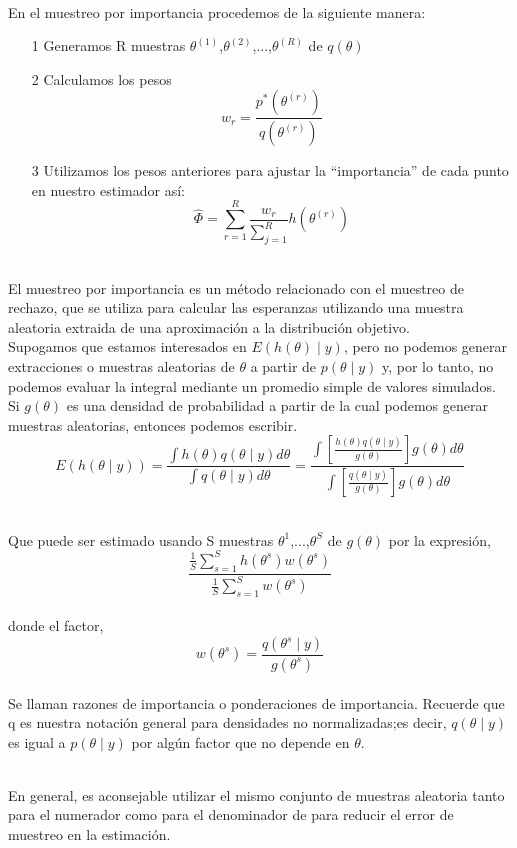 \documentclass[12pt]{beamer}
\begin{document}
\begin{frame}
~\\En el muestreo por importancia procedemos de la siguiente manera:
\begin{itemize}
\item[1]Generamos R muestras $\theta^{(1)}$,$\theta^{(2)}$,...,$\theta^{(R)}$ de $q(\theta)$
\item[2]Calculamos los pesos
$$w_{r}=\frac{p^*(\theta^{(r)})}{q(\theta^{(r)})}$$
\item[3]Utilizamos los pesos anteriores para ajustar la “importancia” de cada punto en nuestro estimador así:
$$\hat{\Phi}=\sum\limits_{r=1}^{R}\frac{w_{r}}{\sum\limits_{j=1}^{R}}h(\theta^{(r)}) $$
\end{itemize}
\end{frame}

\begin{frame}
~\\El muestreo por importancia es un método relacionado con el muestreo de rechazo, que se utiliza para calcular las esperanzas utilizando una muestra aleatoria extraida de una aproximación a la distribución objetivo. 
~\\Supogamos que estamos interesados en $E(h(\theta)\mid y)$, pero no podemos generar extracciones o muestras aleatorias de $\theta$ a partir de $p(\theta\mid y)$ y, por lo tanto, no podemos evaluar la integral mediante un promedio simple de valores simulados.
~\\Si $g(\theta)$ es una densidad de probabilidad a partir de la cual podemos generar muestras aleatorias, entonces podemos escribir.
$$E(h(\theta\mid y))=\frac{\int h(\theta)q(\theta\mid y) d\theta}{\int q(\theta\mid y)d\theta}=\frac{\int\left[\frac{h(\theta)q(\theta\mid y)}{g(\theta)}\right]g(\theta)d\theta}{\int\left[\frac{q(\theta\mid y)}{g(\theta)}\right]g(\theta)d\theta} $$
\end{frame}
\begin{frame}
~\\Que puede ser estimado usando S muestras $\theta^1$,...,$\theta^S$ de $g(\theta)$ por la expresión,
$$\frac{\frac{1}{S}\sum\limits_{s=1}^{S}h(\theta^s)w(\theta^s)}{\frac{1}{S}\sum\limits_{s=1}^{S}w(\theta^s)} $$    
~\\ donde el factor,
$$w(\theta^s)=\frac{q(\theta^s\mid y)}{g(\theta^s)} $$
~\\ Se llaman razones de importancia o ponderaciones de importancia. Recuerde que q es nuestra notación general para densidades no normalizadas;es decir, $q(\theta\mid y)$ es igual a $p(\theta\mid y)$ por algún factor que no depende en $\theta$.
\end{frame}

\begin{frame}
~\\ En general, es aconsejable utilizar el mismo conjunto de muestras aleatoria tanto para el numerador como para el denominador de  para reducir el error de muestreo en la estimación.
\end{frame}
\end{document}
